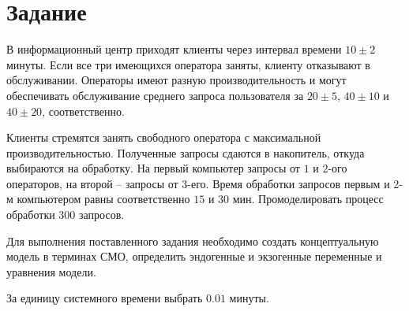 \chapter{Задание}

В информационный центр приходят клиенты через интервал времени $10 \pm 2$ минуты. Если все три имеющихся оператора заняты, клиенту отказывают в
обслуживании. Операторы имеют разную производительность и могут обеспечивать обслуживание среднего запроса пользователя за $20 \pm 5$, $40 \pm 10$ и
$40 \pm 20$, соответственно. 

Клиенты стремятся занять свободного оператора с максимальной производительностью. Полученные запросы сдаются в накопитель, откуда выбираются на обработку. На первый компьютер запросы от $1$ и $2$-ого
операторов, на второй -- запросы от 3-его. Время обработки запросов первым и 2-м компьютером равны соответственно $15$ и $30$ мин. Промоделировать процесс
обработки $300$ запросов.

Для выполнения поставленного задания необходимо создать
концептуальную модель в терминах СМО, определить эндогенные и экзогенные переменные и уравнения модели. 

За единицу системного времени выбрать $0.01$ минуты.